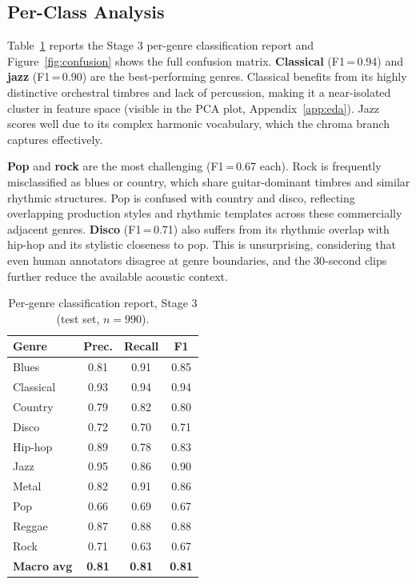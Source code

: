 \documentclass[10pt, twocolumn, a4paper]{article}
\begin{document}
\subsection{Per-Class Analysis}

Table~\ref{tab:perclass} reports the Stage 3 per-genre classification report and Figure~\ref{fig:confusion} shows the full confusion matrix. \textbf{Classical} (F1\,=\,0.94) and \textbf{jazz} (F1\,=\,0.90) are the best-performing genres. Classical benefits from its highly distinctive orchestral timbres and lack of percussion, making it a near-isolated cluster in feature space (visible in the PCA plot, Appendix~\ref{app:eda}). Jazz scores well due to its complex harmonic vocabulary, which the chroma branch captures effectively.

\textbf{Pop} and \textbf{rock} are the most challenging (F1\,=\,0.67 each). Rock is frequently misclassified as blues or country, which share guitar-dominant timbres and similar rhythmic structures. Pop is confused with country and disco, reflecting overlapping production styles and rhythmic templates across these commercially adjacent genres. \textbf{Disco} (F1\,=\,0.71) also suffers from its rhythmic overlap with hip-hop and its stylistic closeness to pop. This is unsurprising, considering that even human annotators disagree at genre boundaries, and the 30-second clips further reduce the available acoustic context.

\begin{table}[H]
\centering
\caption{Per-genre classification report, Stage 3 (test set, $n=990$).}
\label{tab:perclass}
\begin{tabular}{lccc}
\toprule
\textbf{Genre} & \textbf{Prec.} & \textbf{Recall} & \textbf{F1} \\
\midrule
Blues      & 0.81 & 0.91 & 0.85 \\
Classical  & 0.93 & 0.94 & 0.94 \\
Country    & 0.79 & 0.82 & 0.80 \\
Disco      & 0.72 & 0.70 & 0.71 \\
Hip-hop    & 0.89 & 0.78 & 0.83 \\
Jazz       & 0.95 & 0.86 & 0.90 \\
Metal      & 0.82 & 0.91 & 0.86 \\
Pop        & 0.66 & 0.69 & 0.67 \\
Reggae     & 0.87 & 0.88 & 0.88 \\
Rock       & 0.71 & 0.63 & 0.67 \\
\midrule
\textbf{Macro avg} & \textbf{0.81} & \textbf{0.81} & \textbf{0.81} \\
\bottomrule
\end{tabular}
\end{table}
\end{document}

